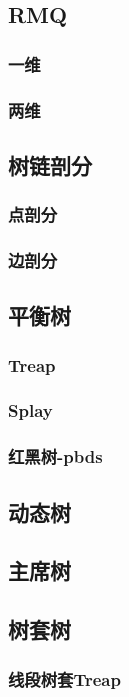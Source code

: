 \documentclass[twocolumn,a4]{article}
\newcommand{\addcpp}[1]{}
\begin{document}
	\subsection{RMQ}
		\subsubsection{一维}
			\addcpp{datastruct/ST}
		\subsubsection{两维}
	\subsection{树链剖分}
		\subsubsection{点剖分}
			\addcpp{datastruct/heavy_light_decomposition}
		\subsubsection{边剖分}
	\subsection{平衡树}
		\subsubsection{Treap}
			\addcpp{datastruct/treap}
		\subsubsection{Splay}
		\subsubsection{红黑树-pbds}
			\addcpp{datastruct/rbt_pbds}
	\subsection{动态树}
	\subsection{主席树}
		\addcpp{datastruct/perSeg}
	\subsection{树套树}
		\subsubsection{线段树套Treap}
			\addcpp{datastruct/seg_treap}
\end{document}
